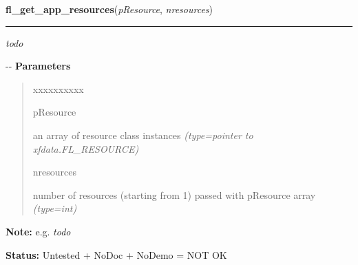 \hspace{.8\funcindent}\begin{boxedminipage}{\funcwidth}

    \raggedright \textbf{fl\_get\_app\_resources}(\textit{pResource}, \textit{nresources})

    \vspace{-1.5ex}

    \rule{\textwidth}{0.5\fboxrule}
\setlength{\parskip}{2ex}

\emph{todo}

-{}-
\setlength{\parskip}{1ex}
      \textbf{Parameters}
      \vspace{-1ex}

      \begin{quote}
        \begin{Ventry}{xxxxxxxxxx}

          \item[pResource]


an array of resource class instances
            {\it (type=pointer to xfdata.FL\_RESOURCE)}

          \item[nresources]


number of resources (starting from 1) passed with pResource array
            {\it (type=int)}

        \end{Ventry}

      \end{quote}

\textbf{Note:} 
e.g. \emph{todo}


\textbf{Status:} 
Untested + NoDoc + NoDemo = NOT OK


    \end{boxedminipage}

    \label{xformslib:flxbasic:fl_set_graphics_mode}

    \vspace{0.5ex}

